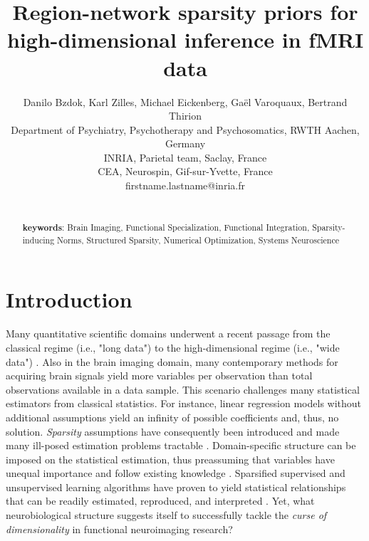 \documentclass{article} %
\title{Region-network sparsity priors for\\
high-dimensional inference in fMRI data}
\begin{document}
\author{Danilo Bzdok, Karl Zilles, Michael Eickenberg,
  Ga\"el Varoquaux, Bertrand Thirion\\
  Department of Psychiatry, Psychotherapy and Psychosomatics, RWTH Aachen, Germany\\
  INRIA, Parietal team, Saclay, France\\
  CEA, Neurospin, Gif-sur-Yvette, France\\
  firstname.lastname@inria.fr}

\maketitle

\begin{abstract}


\textbf{\\keywords}:
Brain Imaging, Functional Specialization, Functional Integration,
Sparsity-inducing Norms, Structured Sparsity,
Numerical Optimization, Systems Neuroscience

\end{abstract}



\section{Introduction}
Many quantitative scientific domains underwent a
recent passage from the classical regime (i.e., "long data")  to
the high-dimensional regime (i.e., "wide data")
\cite{jordan2015massive}.
Also in the brain imaging domain,
many contemporary methods for acquiring brain signals yield
more variables per observation than
total observations available in a data sample.
This scenario challenges many statistical estimators from
classical statistics.
For instance,
linear regression models without additional assumptions
yield an infinity of possible coefficients
and, thus, no solution.
%
\textit{Sparsity} assumptions have consequently been
introduced and made many ill-posed estimation problems tractable
\cite{buhlmann2011statistics, hastie2015statistical}.
Domain-specific structure can be imposed on the 
statistical estimation,
thus preassuming that variables have unequal importance
and follow existing knowledge
\cite{bach2012optimization}.
Sparsified supervised and unsupervised
learning algorithms have proven to yield
statistical relationships that can be readily
estimated, reproduced, and interpreted
\cite{giraud2014introduction}.
%
Yet, what neurobiological structure suggests itself
to successfully tackle the
\textit{curse of dimensionality} in
functional neuroimaging research?
\end{document}
